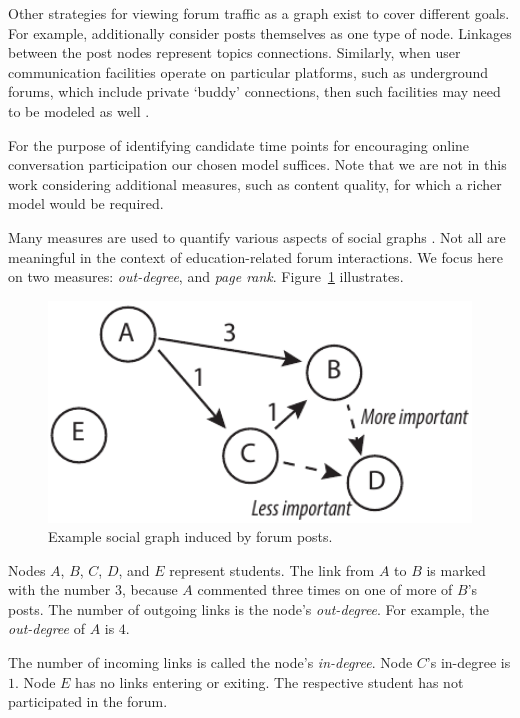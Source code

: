 Other strategies for viewing forum traffic as a graph exist to cover
different goals. For example, \cite{Anwar2013} additionally consider
posts themselves as one type of node. Linkages between the post nodes
represent topics connections. Similarly, when user communication
facilities operate on particular platforms, such as underground
forums, which include private `buddy' connections, then such
facilities may need to be modeled as well \cite{Moto2011}.

For the purpose of identifying candidate time points for encouraging
online conversation participation our chosen model suffices. Note that
we are not in this work considering additional measures, such as
content quality, for which a richer model would be required.

Many measures are used to quantify various aspects of social graphs
\cite{hann2005, lesk14}. Not all are meaningful in the context of
education-related forum interactions. We focus here on two measures:
{\em out-degree}, and {\em page rank}. Figure~\ref{fig:forumGraph}
illustrates.

\begin{figure}[htp]
       \centering
       \includegraphics[width=1.0\textwidth]{Figs/forumNetworkExample.pdf}
       \caption{\textnormal{Example social graph induced by forum posts.}}
       \label{fig:forumGraph}
\end{figure}

Nodes $A$, $B$, $C$, $D$, and $E$ represent students. The link from
$A$ to $B$ is marked with the number $3$, because $A$ commented three
times on one of more of $B$'s posts. The number of outgoing links is
the node's {\em out-degree}. For example, the {\em out-degree} of $A$
is $4$.

The number of incoming links is called the node's {\em
  in-degree}. Node $C$'s in-degree is $1$. Node $E$ has no links
entering or exiting. The respective student has not participated in
the forum.

